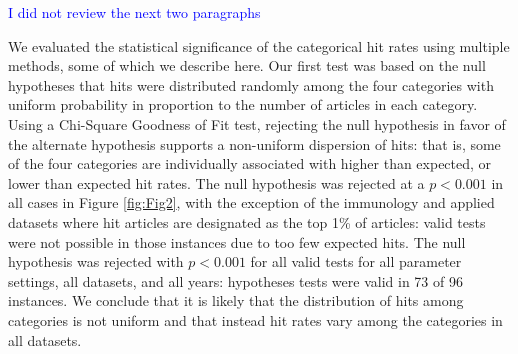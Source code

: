 \documentclass[NETN]{stjour}
\begin{document}
\textcolor{blue}{I did not review the next two paragraphs}

We evaluated the statistical significance of the categorical hit rates using multiple methods, some of which we describe here.  Our first test was based on the null hypotheses that hits were distributed randomly among the four categories with uniform probability in proportion to the number of articles in each category. Using a Chi-Square Goodness of Fit test, rejecting the null hypothesis in favor of the alternate hypothesis supports a non-uniform dispersion of hits: that is, some of the four categories are individually associated with higher than expected, or lower than expected hit rates. The null hypothesis was rejected at a $p<0.001$ in all cases in  Figure \ref{fig:Fig2}, with the exception of the immunology and applied datasets where hit articles are designated as the top 1\% of articles: valid tests were not possible in those instances due to too few expected hits. The null hypothesis was rejected with $p<0.001$ for all valid tests for all parameter settings, all datasets, and all years: hypotheses tests were valid in 73 of 96 instances. We conclude that it is likely that the distribution of hits among categories is not uniform and that instead hit rates vary among the categories in all datasets. 
\end{document}
